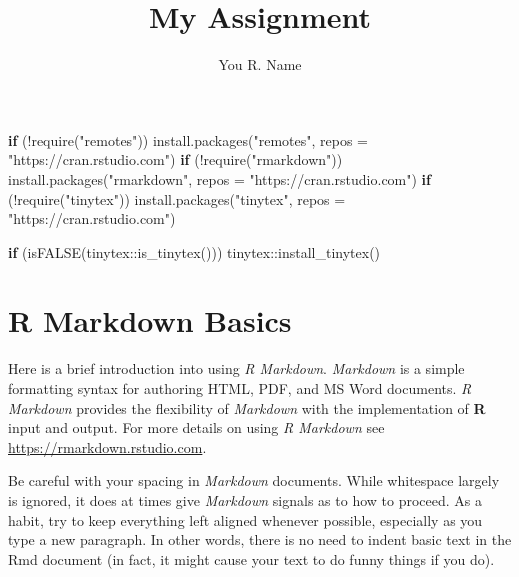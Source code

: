 \documentclass{article}
\author{You R. Name}
\title{My Assignment}
\date{}
\newenvironment{Shaded}{\begin{snugshade}}{\end{snugshade}}
\newcommand{\AttributeTok}[1]{\textcolor[rgb]{0.77,0.63,0.00}{#1}}
\newcommand{\ControlFlowTok}[1]{\textcolor[rgb]{0.13,0.29,0.53}{\textbf{#1}}}
\newcommand{\FunctionTok}[1]{\textcolor[rgb]{0.00,0.00,0.00}{#1}}
\newcommand{\NormalTok}[1]{#1}
\newcommand{\SpecialCharTok}[1]{\textcolor[rgb]{0.00,0.00,0.00}{#1}}
\newcommand{\StringTok}[1]{\textcolor[rgb]{0.31,0.60,0.02}{#1}}
\begin{document}
\maketitle
\thispagestyle{empty}
\tableofcontents
\setcounter{page}{0}
\clearpage

\begin{Shaded}
\begin{Highlighting}[]
\ControlFlowTok{if}\NormalTok{ (}\SpecialCharTok{!}\FunctionTok{require}\NormalTok{(}\StringTok{"remotes"}\NormalTok{)) }
  \FunctionTok{install.packages}\NormalTok{(}\StringTok{"remotes"}\NormalTok{, }\AttributeTok{repos =} \StringTok{"https://cran.rstudio.com"}\NormalTok{)}
\ControlFlowTok{if}\NormalTok{ (}\SpecialCharTok{!}\FunctionTok{require}\NormalTok{(}\StringTok{"rmarkdown"}\NormalTok{)) }
  \FunctionTok{install.packages}\NormalTok{(}\StringTok{"rmarkdown"}\NormalTok{, }\AttributeTok{repos =} \StringTok{"https://cran.rstudio.com"}\NormalTok{)}
\ControlFlowTok{if}\NormalTok{ (}\SpecialCharTok{!}\FunctionTok{require}\NormalTok{(}\StringTok{"tinytex"}\NormalTok{)) }
  \FunctionTok{install.packages}\NormalTok{(}\StringTok{"tinytex"}\NormalTok{, }\AttributeTok{repos =} \StringTok{"https://cran.rstudio.com"}\NormalTok{)}

\ControlFlowTok{if}\NormalTok{ (}\FunctionTok{isFALSE}\NormalTok{(tinytex}\SpecialCharTok{::}\FunctionTok{is\_tinytex}\NormalTok{())) tinytex}\SpecialCharTok{::}\FunctionTok{install\_tinytex}\NormalTok{()}
\end{Highlighting}
\end{Shaded}

\hypertarget{rmd-basics}{%
\section{R Markdown Basics}\label{rmd-basics}}

Here is a brief introduction into using \emph{R Markdown}.
\emph{Markdown} is a simple formatting syntax for authoring HTML, PDF,
and MS Word documents. \emph{R Markdown} provides the flexibility of
\emph{Markdown} with the implementation of \textbf{R} input and output.
For more details on using \emph{R Markdown} see
\url{https://rmarkdown.rstudio.com}.

Be careful with your spacing in \emph{Markdown} documents. While
whitespace largely is ignored, it does at times give \emph{Markdown}
signals as to how to proceed. As a habit, try to keep everything left
aligned whenever possible, especially as you type a new paragraph. In
other words, there is no need to indent basic text in the Rmd document
(in fact, it might cause your text to do funny things if you do).
\end{document}
